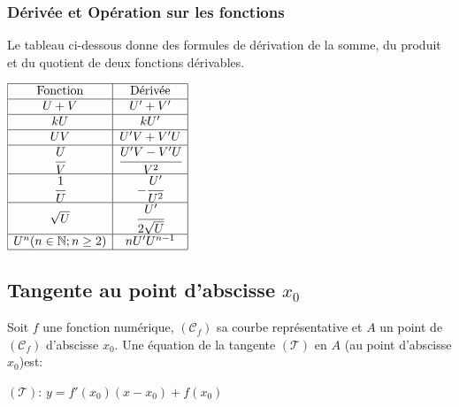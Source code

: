 \documentclass[a4paper, 12pt]{report}
\begin{document}
                \subsubsection{Dérivée et Opération sur les fonctions} 
                    Le tableau ci-dessous donne des formules de dérivation de la somme, du produit et du quotient de deux fonctions dérivables.
                        \begin{center}
                            $\begin{array}{|c|c|}
                                \hline
                                    \text{Fonction} &  \text{Dérivée}       \\ \hline
                                        U+V         &    U'+V'              \\ \hline
                                        kU          &    kU'                \\ \hline
                                        UV          &  U'V+V'U              \\ \hline
                                \cfrac{U}{V}        & \cfrac{U'V-V'U}{V^2}  \\ \hline
                                \cfrac{1}{U}        & -\cfrac{U'}{U^2}      \\ \hline
                                \sqrt{U}            & \cfrac{U'}{2\sqrt{U}} \\ \hline
                        U^n(n\in\mathbb{N};n\geq 2) & nU'U^{n-1}            \\ \hline
                            \end{array}$
                        \end{center}
            \subsection{Tangente au point d'abscisse $x_0$}
                Soit $f$ une fonction numérique, $(\mathcal{C}_f)$ sa courbe représentative et $A$ un point de $(\mathcal{C}_f)$ d'abscisse $x_0$. 
                Une équation de la tangente $(\mathcal{T})$ en $A$ (au point d'abscisse $x_0$)est:\\ 
                \begin{center}
                    $(\mathcal{T})$: $y=f'(x_0)(x-x_0)+f(x_0)$
                \end{center}
\end{document}
